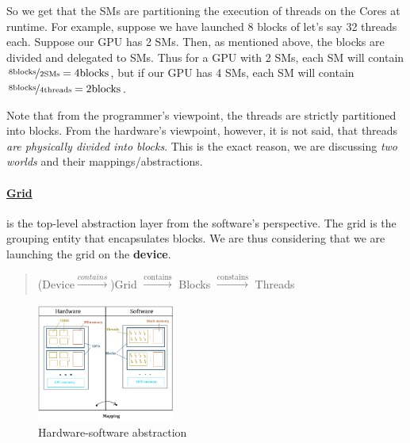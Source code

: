 So we get that the SMs are partitioning the execution of threads on the Cores at runtime. For example, suppose we have 
launched 8 blocks of let's say 32 threads each. Suppose our GPU has 2 SMs. Then, as mentioned above, 
the blocks are divided and delegated to SMs. Thus for a GPU with 2 SMs, each SM will contain 
$\nicefrac{8\text{blocks}}{2\text{SMs}} = 4 \text{blocks}$, but if our GPU has 4 SMs, 
each SM will contain $\nicefrac{8\text{blocks}}{4\text{threads}} = 2 \text{blocks}$.

Note that from the programmer's viewpoint, the threads are strictly partitioned into blocks. 
From the hardware's viewpoint, however, it is not said, that threads \textit{are physically divided into blocks}. 
This is the exact reason, we are discussing \textit{two worlds} and their mappings/abstractions.

\vspace{-15pt}
\paragraph{\underline{Grid}} is the top-level abstraction layer from the software's perspective. The grid
is the grouping entity that encapsulates blocks. We are thus considering that we are launching 
the grid on the \textbf{device}.
\vspace{-15pt}
\begin{quote}
   \centering
    (Device$\xrightarrow[]{contains}$)Grid $\xrightarrow[]{\text{contains}}$ Blocks $\xrightarrow[]{\text{constains}}$ Threads
\end{quote}

\begin{figure}
   \begin{center}
      \vspace{-35pt}
      \centering
       \includegraphics[width=0.4\textwidth]{pngs/hard_soft.png}
    \end{center}
      \vspace{-20pt}
   \caption{Hardware-software abstraction}
   \label{abstraction}
\end{figure}

